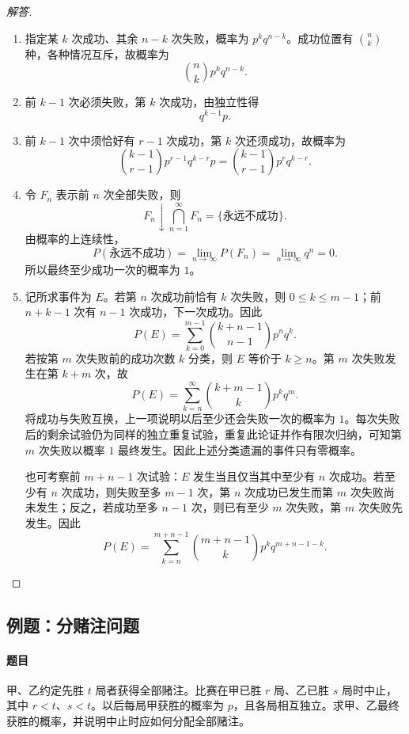 \begin{proof}[解答]
\begin{enumerate}
\item 指定某 $k$ 次成功、其余 $n-k$ 次失败，概率为 $p^kq^{n-k}$。成功位置有 $\binom nk$ 种，各种情况互斥，故概率为
\[\binom nk p^kq^{n-k}.\]
\item 前 $k-1$ 次必须失败，第 $k$ 次成功，由独立性得
\[q^{k-1}p.\]
\item 前 $k-1$ 次中须恰好有 $r-1$ 次成功，第 $k$ 次还须成功，故概率为
\[\binom{k-1}{r-1}p^{r-1}q^{k-r}p=\binom{k-1}{r-1}p^rq^{k-r}.\]
\item 令 $F_n$ 表示前 $n$ 次全部失败，则
\[F_n\downarrow\bigcap_{n=1}^\infty F_n=\{\text{永远不成功}\}.\]
由概率的上连续性，
\[P(\text{永远不成功})=\lim_{n\to\infty}P(F_n)=\lim_{n\to\infty}q^n=0.\]
所以最终至少成功一次的概率为 $1$。
\item 记所求事件为 $E$。若第 $n$ 次成功前恰有 $k$ 次失败，则 $0\leq k\leq m-1$；前 $n+k-1$ 次有 $n-1$ 次成功，下一次成功。因此
\[P(E)=\sum_{k=0}^{m-1}\binom{k+n-1}{n-1}p^nq^k.\]
若按第 $m$ 次失败前的成功次数 $k$ 分类，则 $E$ 等价于 $k\geq n$。第 $m$ 次失败发生在第 $k+m$ 次，故
\[P(E)=\sum_{k=n}^{\infty}\binom{k+m-1}{k}p^kq^m.\]
将成功与失败互换，上一项说明以后至少还会失败一次的概率为 $1$。每次失败后的剩余试验仍为同样的独立重复试验，重复此论证并作有限次归纳，可知第 $m$ 次失败以概率 $1$ 最终发生。因此上述分类遗漏的事件只有零概率。

也可考察前 $m+n-1$ 次试验：$E$ 发生当且仅当其中至少有 $n$ 次成功。若至少有 $n$ 次成功，则失败至多 $m-1$ 次，第 $n$ 次成功已发生而第 $m$ 次失败尚未发生；反之，若成功至多 $n-1$ 次，则已有至少 $m$ 次失败，第 $m$ 次失败先发生。因此
\[P(E)=\sum_{k=n}^{m+n-1}\binom{m+n-1}{k}p^kq^{m+n-1-k}.\]
\end{enumerate}
\end{proof}

\subsection{例题：分赌注问题}\label{note:c1:e28}
\paragraph{题目}
甲、乙约定先胜 $t$ 局者获得全部赌注。比赛在甲已胜 $r$ 局、乙已胜 $s$ 局时中止，其中 $r<t$、$s<t$。以后每局甲获胜的概率为 $p$，且各局相互独立。求甲、乙最终获胜的概率，并说明中止时应如何分配全部赌注。

